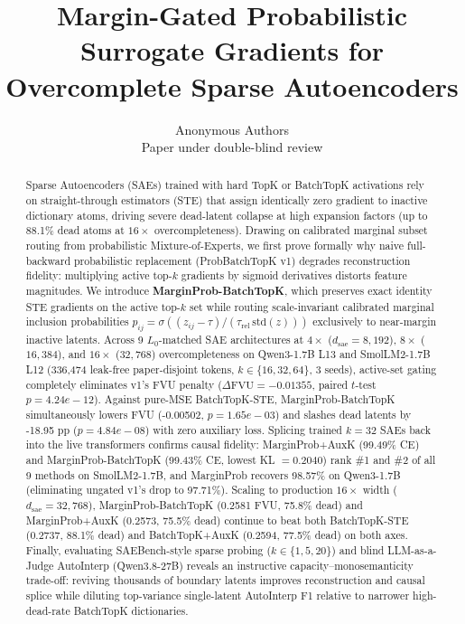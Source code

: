 \documentclass[10pt]{article}
\title{Margin-Gated Probabilistic Surrogate Gradients for Overcomplete Sparse Autoencoders}
\author{\name Anonymous Authors \\
\addr Paper under double-blind review}
\begin{document}
\maketitle
\begin{abstract}
Sparse Autoencoders (SAEs) trained with hard TopK or BatchTopK activations rely on straight-through estimators (STE) that assign identically zero gradient to inactive dictionary atoms, driving severe dead-latent collapse at high expansion factors (up to 88.1\% dead atoms at $16\times$ overcompleteness). Drawing on calibrated marginal subset routing from probabilistic Mixture-of-Experts, we first prove formally why naive full-backward probabilistic replacement (ProbBatchTopK v1) degrades reconstruction fidelity: multiplying active top-$k$ gradients by sigmoid derivatives distorts feature magnitudes. We introduce \textbf{MarginProb-BatchTopK}, which preserves exact identity STE gradients on the active top-$k$ set while routing scale-invariant calibrated marginal inclusion probabilities $p_{ij} = \sigma((z_{ij} - \tau)/(\tau_{\mathrm{rel}}\,\mathrm{std}(z)))$ exclusively to near-margin inactive latents. Across 9 $L_0$-matched SAE architectures at $4\times$ ($d_{\mathrm{sae}}=8{,}192$), $8\times$ ($16{,}384$), and $16\times$ ($32{,}768$) overcompleteness on Qwen3-1.7B L13 and SmolLM2-1.7B L12 (336,474 leak-free paper-disjoint tokens, $k \in \{16,32,64\}$, 3 seeds), active-set gating completely eliminates v1's FVU penalty ($\Delta\mathrm{FVU} = -0.01355$, paired $t$-test $p=4.24e-12$). Against pure-MSE BatchTopK-STE, MarginProb-BatchTopK simultaneously lowers FVU (-0.00502, $p=1.65e-03$) and slashes dead latents by -18.95 pp ($p=4.84e-08$) with zero auxiliary loss. Splicing trained $k=32$ SAEs back into the live transformers confirms causal fidelity: MarginProb+AuxK (99.49\% CE) and MarginProb-BatchTopK (99.43\% CE, lowest KL $=0.2040$) rank \#1 and \#2 of all 9 methods on SmolLM2-1.7B, and MarginProb recovers 98.57\% on Qwen3-1.7B (eliminating ungated v1's drop to 97.71\%). Scaling to production $16\times$ width ($d_{\mathrm{sae}}=32{,}768$), MarginProb-BatchTopK (0.2581 FVU, 75.8\% dead) and MarginProb+AuxK (0.2573, 75.5\% dead) continue to beat both BatchTopK-STE (0.2737, 88.1\% dead) and BatchTopK+AuxK (0.2594, 77.5\% dead) on both axes. Finally, evaluating SAEBench-style sparse probing ($k \in \{1,5,20\}$) and blind LLM-as-a-Judge AutoInterp (Qwen3.8-27B) reveals an instructive capacity--monosemanticity trade-off: reviving thousands of boundary latents improves reconstruction and causal splice while diluting top-variance single-latent AutoInterp F1 relative to narrower high-dead-rate BatchTopK dictionaries.
\end{abstract}
\end{document}
